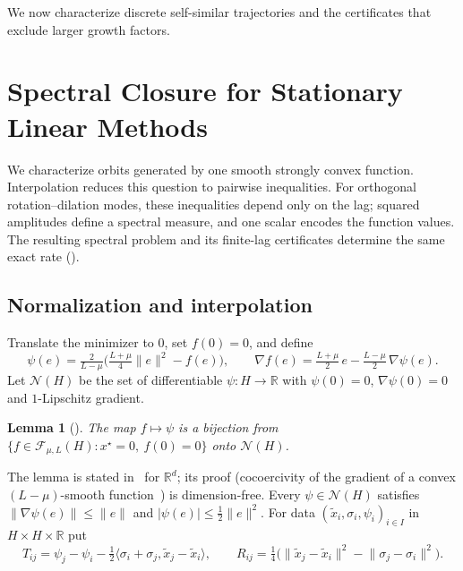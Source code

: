 \documentclass[11pt]{article}
\newtheorem{lemma}[theorem]{Lemma}
\theoremstyle{definition}
\theoremstyle{remark}
\newcommand{\R}{\mathbb R}
\newcommand{\cF}{\mathcal F}
\newcommand{\cS}{\mathcal N}\newcommand{\Szero}{\mathcal S_0}
\newcommand{\ip}[2]{\langle #1,#2\rangle}
\newcommand{\norm}[1]{\lVert #1\rVert}
\begin{document}
We now characterize discrete self-similar trajectories and the certificates
that exclude larger growth factors.

%
\section{Spectral Closure for Stationary Linear Methods}
\label{sec:closure}
%

We characterize orbits generated by one smooth strongly convex function.
Interpolation reduces this question to pairwise inequalities.  For orthogonal
rotation--dilation modes, these inequalities depend only on the lag; squared
amplitudes define a spectral measure, and one scalar encodes the function values.
The resulting spectral problem and its finite-lag certificates determine the
same exact rate ().

\subsection{Normalization and interpolation}

Translate the minimizer to \(0\), set \(f(0)=0\), and define
\begin{equation}\label{eq:psi}
\psi(e)=\tfrac{2}{L-\mu}\bigl(\tfrac{L+\mu}{4}\norm e^2-f(e)\bigr),\qquad
\nabla f(e)=\tfrac{L+\mu}{2}\,e-\tfrac{L-\mu}{2}\,\nabla\psi(e).
\end{equation}
Let \(\cS(H)\) be the set of differentiable \(\psi:H\to\R\) with
\(\psi(0)=0\), \(\nabla\psi(0)=0\) and \(1\)-Lipschitz gradient.

\begin{lemma}[{\cite[Lemma~A.1]{TA}}]\label{lem:norm}
The map \(f\mapsto\psi\) is a bijection from
\(\{f\in\cF_{\mu,L}(H):x^\star=0,\ f(0)=0\}\) onto \(\cS(H)\).
\end{lemma}

The lemma is stated in~\cite{TA} for \(\R^d\); its proof (cocoercivity
of the gradient of a convex \((L-\mu)\)-smooth function~\cite{THG17}) is
dimension-free.  Every \(\psi\in\cS(H)\) satisfies
\(\norm{\nabla\psi(e)}\le\norm e\) and \(|\psi(e)|\le\frac12\norm e^2\).
For data \((\tilde x_i,\sigma_i,\psi_i)_{i\in I}\) in \(H\times H\times\R\) put
\begin{equation}\label{eq:TR}
T_{ij}=\psi_j-\psi_i-\tfrac12\ip{\sigma_i+\sigma_j}{\tilde x_j-\tilde x_i},\qquad
R_{ij}=\tfrac14\bigl(\norm{\tilde x_j-\tilde x_i}^2-\norm{\sigma_j-\sigma_i}^2\bigr).
\end{equation}
\end{document}
